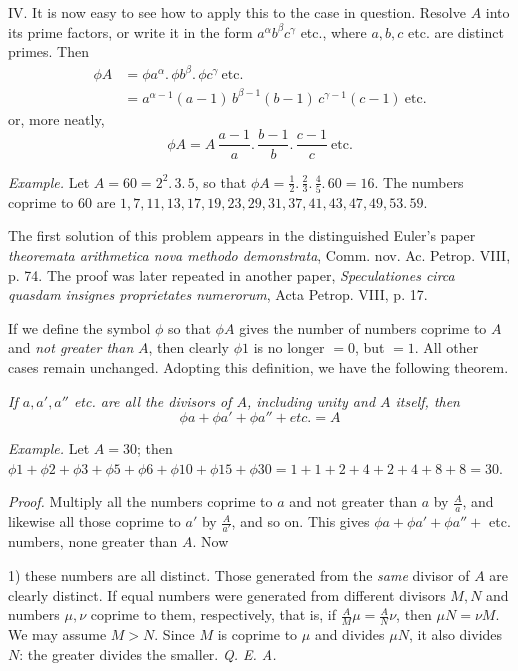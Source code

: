IV. It is now easy to see how to apply this to the case in question. Resolve $A$ into its prime factors, or write it in the form $a^\alpha b^\beta c^\gamma$ etc., where $a,b,c$ etc. are distinct primes. Then
\[
\begin{aligned}
\phi A&=\phi a^\alpha.\,\phi b^\beta.\,\phi c^\gamma\ \mathrm{etc.}\\
&=a^{\alpha-1}(a-1)\,b^{\beta-1}(b-1)\,c^{\gamma-1}(c-1)\ \mathrm{etc.}
\end{aligned}
\]
or, more neatly,
\[\phi A=A\,\frac{a-1}{a}.\,\frac{b-1}{b}.\,\frac{c-1}{c}\ \mathrm{etc.}\]

\emph{Example.} Let $A=60=2^2.\,3.\,5$, so that $\phi A=\frac{1}{2}.\,\frac{2}{3}.\,\frac{4}{5}.\,60=16$. The numbers coprime to $60$ are $1,7,11,13,17,19,23,29,31,37,41,43,47,49,53.\,59.$

The first solution of this problem appears in the distinguished Euler's paper \emph{theoremata arithmetica nova methodo demonstrata}, Comm. nov. Ac. Petrop. VIII, p. 74. The proof was later repeated in another paper, \emph{Speculationes circa quasdam insignes proprietates numerorum}, Acta Petrop. VIII, p. 17.

If we define the symbol $\phi$ so that $\phi A$ gives the number of numbers coprime to $A$ and \emph{not greater than} $A$, then clearly $\phi1$ is no longer $=0$, but $=1$. All other cases remain unchanged. Adopting this definition, we have the following theorem.

\emph{If $a,a',a''$ etc. are all the divisors of $A$, including unity and $A$ itself, then}
\[\phi a+\phi a'+\phi a''+\textit{etc.}=A\]

\emph{Example.} Let $A=30$; then $\phi1+\phi2+\phi3+\phi5+\phi6+\phi10+\phi15+\phi30=1+1+2+4+2+4+8+8=30$.

\emph{Proof.} Multiply all the numbers coprime to $a$ and not greater than $a$ by $\frac{A}{a}$, and likewise all those coprime to $a'$ by $\frac{A}{a'}$, and so on. This gives $\phi a+\phi a'
+\phi a''+$ etc. numbers, none greater than $A$. Now

1) these numbers are all distinct. Those generated from the \emph{same} divisor of $A$ are clearly distinct. If equal numbers were generated from different divisors $M,N$ and numbers $\mu,\nu$ coprime to them, respectively, that is, if $\frac{A}{M}\mu=\frac{A}{N}\nu$, then $\mu N=\nu M$. We may assume $M>N$. Since $M$ is coprime to $\mu$ and divides $\mu N$, it also divides $N$: the greater divides the smaller. \emph{Q. E. A.}

